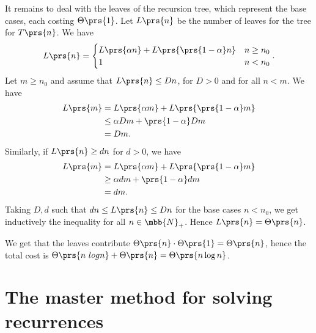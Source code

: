 \documentclass[oneside]{scrbook}
\theoremstyle{definition}
\begin{document}
\begin{exercise}
It remains to deal with the leaves of the recursion tree, which represent the base cases, each costing $\Theta\prs{1}$.
Let $L\prs{n}$ be the number of leaves for the tree for $T\prs{n}$. We have
\begin{align*}
	L\prs{n} =
	\begin{cases}
		L\prs{\alpha n} + L\prs{\prs{1-\alpha}n} & n \geq n_0 \\
		1 & n < n_0
	\end{cases} \text{.}
\end{align*}
Let $m \geq n_0$ and assume that $L\prs{n} \leq D n$, for $D > 0$ and for all $n < m$. We have
\begin{align*}
L\prs{m} &= L\prs{\alpha m} + L\prs{\prs{1-\alpha}m}
\\&\leq \alpha D m + \prs{1-\alpha} Dm
\\&= Dm \text{.}
\end{align*}
Similarly, if $L\prs{n} \geq d n$ for $d > 0$, we have
\begin{align*}
L\prs{m} &= L\prs{\alpha m} + L\prs{\prs{1-\alpha}m}
\\&\geq \alpha d m + \prs{1 - \alpha} dm
\\&= dm \text{.}
\end{align*}
Taking $D, d$ such that $d n \leq L\prs{n} \leq Dn$ for the base cases $n < n_0$, we get inductively the inequality for all $n \in \mbb{N}_+$. Hence $L\prs{n} = \Theta\prs{n}$.

We get that the leaves contribute  $\Theta\prs{n} \cdot \Theta\prs{1} = \Theta\prs{n}$, hence the total cost is $\Theta\prs{n \ log n} + \Theta\prs{n} = \Theta\prs{n \log n}$.
\end{exercise}

\section{The master method for solving recurrences}
\end{document}
